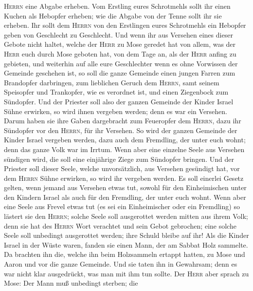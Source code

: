 \textsc{Herrn} eine Abgabe erheben.  Vom Erstling eures
Schrotmehls sollt ihr einen Kuchen als Hebopfer erheben; wie die Abgabe
von der Tenne sollt ihr sie erheben.  Ihr sollt dem
\textsc{Herrn} von den Erstlingen eures Schrotmehls ein Hebopfer geben
von Geschlecht zu Geschlecht.  Und wenn ihr aus Versehen
eines dieser Gebote nicht haltet, welche der \textsc{Herr} zu Mose
geredet hat  von allem, was der \textsc{Herr} euch durch
Mose geboten hat, von dem Tage an, als der \textsc{Herr} anfing zu
gebieten, und weiterhin auf alle eure Geschlechter  wenn
es ohne Vorwissen der Gemeinde geschehen ist, so soll die ganze Gemeinde
einen jungen Farren zum Brandopfer darbringen, zum lieblichen Geruch dem
\textsc{Herrn}, samt seinem Speisopfer und Trankopfer, wie es verordnet
ist, und einen Ziegenbock zum Sündopfer.  Und der
Priester soll also der ganzen Gemeinde der Kinder Israel Sühne erwirken,
so wird ihnen vergeben werden; denn es war ein Versehen. Darum haben sie
ihre Gaben dargebracht zum Feueropfer dem \textsc{Herrn}, dazu ihr
Sündopfer vor den \textsc{Herrn}, für ihr Versehen.  So
wird der ganzen Gemeinde der Kinder Israel vergeben werden, dazu auch
dem Fremdling, der unter euch wohnt; denn das ganze Volk war im Irrtum.
 Wenn aber eine einzelne Seele aus Versehen sündigen
wird, die soll eine einjährige Ziege zum Sündopfer bringen.
 Und der Priester soll dieser Seele, welche
unvorsätzlich, aus Versehen gesündigt hat, vor dem \textsc{Herrn} Sühne
erwirken, so wird ihr vergeben werden.  Es soll einerlei
Gesetz gelten, wenn jemand aus Versehen etwas tut, sowohl für den
Einheimischen unter den Kindern Israel als auch für den Fremdling, der
unter euch wohnt.  Wenn aber eine Seele aus Frevel etwas
tut (es sei ein Einheimischer oder ein Fremdling) so lästert sie den
\textsc{Herrn}; solche Seele soll ausgerottet werden mitten aus ihrem
Volk;  denn sie hat des \textsc{Herrn} Wort verachtet und
sein Gebot gebrochen; eine solche Seele soll unbedingt ausgerottet
werden; ihre Schuld bleibe auf ihr!  Als die Kinder
Israel in der Wüste waren, fanden sie einen Mann, der am Sabbat Holz
sammelte.  Da brachten ihn die, welche ihn beim
Holzsammeln ertappt hatten, zu Mose und Aaron und vor die ganze
Gemeinde.  Und sie taten ihn in Gewahrsam; denn es war
nicht klar ausgedrückt, was man mit ihm tun sollte.  Der
\textsc{Herr} aber sprach zu Mose: Der Mann muß unbedingt sterben; die

